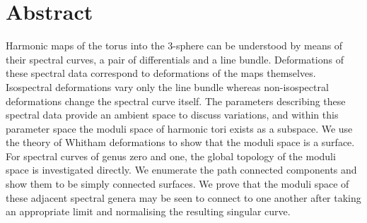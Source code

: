 
\section*{Abstract}
Harmonic maps of the torus into the 3-sphere can be understood by means of their spectral curves, a pair of differentials and a line bundle. Deformations of these spectral data correspond to deformations of the maps themselves. Isospectral deformations vary only the line bundle whereas non-isospectral deformations change the spectral curve itself. The parameters describing these spectral data provide an ambient space to discuss variations, and within this parameter space the moduli space of harmonic tori exists as a subspace. We use the theory of Whitham deformations to show that the moduli space is a surface. For spectral curves of genus zero and one, the global topology of the moduli space is investigated directly. We enumerate the path connected components and show them to be simply connected surfaces. We prove that the moduli space of these adjacent spectral genera may be seen to connect to one another after taking an appropriate limit and normalising the resulting singular curve.

